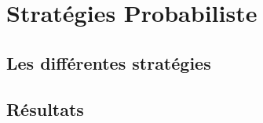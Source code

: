 \section{Stratégies Probabiliste}

\subsection{Les différentes stratégies}
	
	\begin{frame}
		
	\end{frame}

\subsection{Résultats}
	
	\begin{frame}
		
	\end{frame}